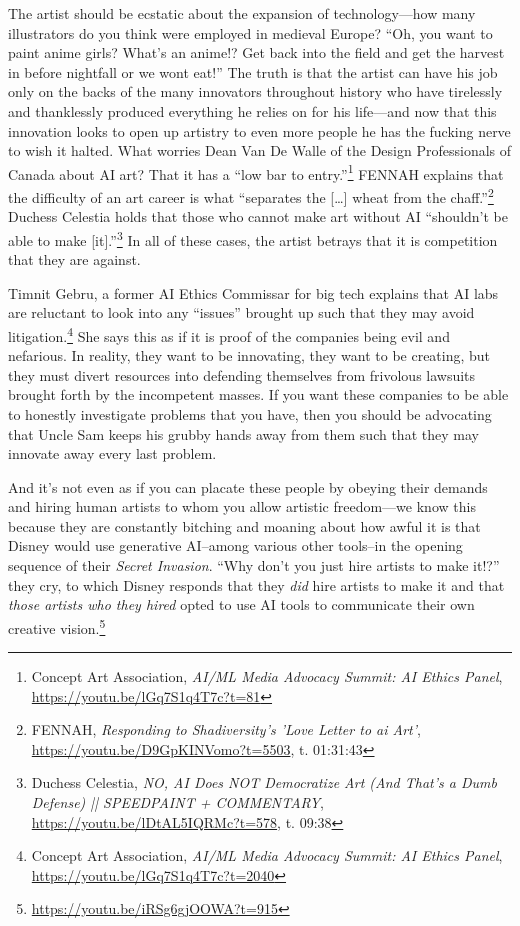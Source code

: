 \documentclass[11pt]{article}
\begin{document}
The artist should be ecstatic about the expansion of technology---how many illustrators do you think were employed in medieval Europe? ``Oh, you want to paint anime girls? What's an anime!? Get back into the field and get the harvest in before nightfall or we wont eat!'' The truth is that the artist can have his job only on the backs of the many innovators throughout history who have tirelessly and thanklessly produced everything he relies on for his life---and now that this innovation looks to open up artistry to even more people he has the fucking nerve to wish it halted. What worries Dean Van De Walle of the Design Professionals of Canada about AI art? That it has a ``low bar to entry.''\footnote{Concept Art Association, \emph{AI/ML Media Advocacy Summit: AI Ethics Panel}, \url{https://youtu.be/lGq7S1q4T7c?t=81}} FENNAH explains that the difficulty of an art career is what ``separates the [\ldots{}] wheat from the chaff.''\footnote{FENNAH, \emph{Responding to Shadiversity's 'Love Letter to ai Art'}, \url{https://youtu.be/D9GpKINVomo?t=5503}, t. 01:31:43} Duchess Celestia holds that those who cannot make art without AI ``shouldn't be able to make [it].''\footnote{Duchess Celestia, \emph{NO, AI Does NOT Democratize Art (And That's a Dumb Defense) || SPEEDPAINT + COMMENTARY}, \url{https://youtu.be/lDtAL5IQRMc?t=578}, t. 09:38} In all of these cases, the artist betrays that it is competition that they are against.

Timnit Gebru, a former AI Ethics Commissar for big tech explains that AI labs are reluctant to look into any ``issues'' brought up such that they may avoid litigation.\footnote{Concept Art Association, \emph{AI/ML Media Advocacy Summit: AI Ethics Panel}, \url{https://youtu.be/lGq7S1q4T7c?t=2040}} She says this as if it is proof of the companies being evil and nefarious. In reality, they want to be innovating, they want to be creating, but they must divert resources into defending themselves from frivolous lawsuits brought forth by the incompetent masses. If you want these companies to be able to honestly investigate problems that you have, then you should be advocating that Uncle Sam keeps his grubby hands away from them such that they may innovate away every last problem.

And it's not even as if you can placate these people by obeying their demands and hiring human artists to whom you allow artistic freedom---we know this because they are constantly bitching and moaning about how awful it is that Disney would use generative AI--among various other tools--in the opening sequence of their \emph{Secret Invasion}. ``Why don't you just hire artists to make it!?'' they cry, to which Disney responds that they \emph{did} hire artists to make it and that \emph{those artists who they hired} opted to use AI tools to communicate their own creative vision.\footnote{\url{https://youtu.be/iRSg6gjOOWA?t=915}}
\end{document}
